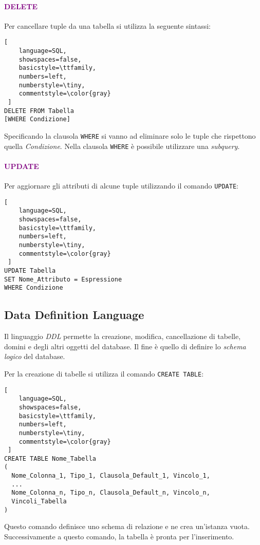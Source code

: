 \paragraph{\textcolor{purple}{DELETE}} Per cancellare tuple da una tabella si utilizza la seguente sintassi:
\begin{lstlisting}[
    language=SQL,
    showspaces=false,
    basicstyle=\ttfamily,
    numbers=left,
    numberstyle=\tiny,
    commentstyle=\color{gray}
 ]
DELETE FROM Tabella
[WHERE Condizione]
\end{lstlisting}
Specificando la clausola \verb|WHERE| si vanno ad eliminare solo le tuple che rispettono quella \emph{Condizione}.
Nella clausola \verb|WHERE| è possibile utilizzare una \emph{subquery}.

\paragraph{\textcolor{purple}{UPDATE}} Per aggiornare gli attributi di alcune tuple utilizzando il comando \verb|UPDATE|:
\begin{lstlisting}[
    language=SQL,
    showspaces=false,
    basicstyle=\ttfamily,
    numbers=left,
    numberstyle=\tiny,
    commentstyle=\color{gray}
 ]
UPDATE Tabella
SET Nome_Attributo = Espressione
WHERE Condizione
\end{lstlisting}

\subsection{Data Definition Language}

Il linguaggio \emph{DDL} permette la creazione, modifica, cancellazione di tabelle,
domini e degli altri oggetti del database. Il fine è quello di definire lo \emph{schema logico}
del database.

Per la creazione di tabelle si utilizza il comando \verb|CREATE TABLE|:
\begin{lstlisting}[
    language=SQL,
    showspaces=false,
    basicstyle=\ttfamily,
    numbers=left,
    numberstyle=\tiny,
    commentstyle=\color{gray}
 ]
CREATE TABLE Nome_Tabella
(
  Nome_Colonna_1, Tipo_1, Clausola_Default_1, Vincolo_1,
  ...
  Nome_Colonna_n, Tipo_n, Clausola_Default_n, Vincolo_n,
  Vincoli_Tabella
)
\end{lstlisting}

Questo comando definisce uno schema di relazione e ne crea un'istanza vuota.
Successivamente a questo comando, la tabella è pronta per l'inserimento.

